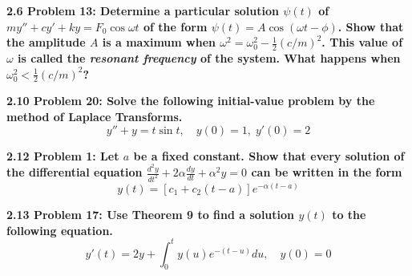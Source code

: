 \documentclass[12pt]{article}
\begin{document}
 \textbf{2.6 Problem 13: Determine a particular solution $\psi(t)$ of 
 $my'' + cy' + ky = F_0\cos \omega t$ of the form $\psi(t) = A\cos(\omega t - \phi)$. Show 
 that the amplitude $A$ is a maximum when $\omega^2 = \omega_0^2 - \frac{1}{2}(c/m)^2$.  This 
 value of $\omega$ is called the \textit{resonant frequency} of the system.  What happens 
 when $\omega_0^2 < \frac{1}{2}(c/m)^2$?}
 \newpage

 \textbf{2.10 Problem 20: Solve the following initial-value problem by the method of Laplace 
 Transforms.}
 $$y'' + y = t\sin t, \quad y(0)=1, \; y'(0)=2$$
 \newpage

 \textbf{2.12 Problem 1: Let $a$ be a fixed constant.  Show that every solution of the 
 differential equation $\frac{d^2 y}{dt^2} + 2\alpha \frac{dy}{dt} + \alpha^2 y = 0$ can be 
 written in the form}
 $$y(t) = [c_1 + c_2(t-a)]e^{-\alpha(t-a)}$$
 \newpage

 \textbf{2.13 Problem 17: Use Theorem 9 to find a solution $y(t)$ to the following equation.}
 $$y'(t) = 2y + \displaystyle\int_{0}^{t}y(u)e^{-(t-u)}du, \quad y(0)=0$$
\end{document}
